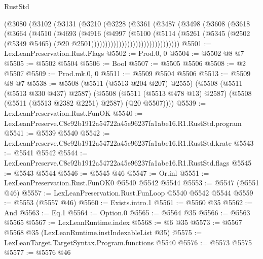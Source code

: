 \begin{lexlean}{RustStd}
\begin{coremodule}
                          (@3080
                            (@3102
                              (@3131
                                (@3210
                                  (@3228
                                    (@3361
                                      (@3487
                                        (@3498
                                          (@3608
                                            (@3618
                                              (@3664
                                                (@4510
                                                  (@4693
                                                    (@4916
                                                      (@4997
                                                        (@5100
                                                          (@5114
                                                            (@5261
                                                              (@5345
                                                                (@2502
                                                                  (@5349 @5465)
                                                                  (@20
                                                                    @2501))))))))))))))))))))))))))))))))
@5501 := LexLeanPreservation.Rust.Flags
@5502 := Prod.{0, 0}
@5504 := @5502 @8 @7
@5505 := @5502 @5504
@5506 := Bool
@5507 := @5505 @5506
@5508 := @2 @5507
@5509 := Prod.mk.{0, 0}
@5511 := @5509 @5504 @5506
@5513 := @5509 @8 @7
@5538 := @5508
    (@5511 (@5513 @204 @207) @2555)
    (@5508
      (@5511 (@5513 @330 @437) @2587)
      (@5508 (@5511 (@5513 @478 @13) @2587) (@5508 (@5511 (@5513 @2382 @2251) @2587) (@20 @5507))))
@5539 := LexLeanPreservation.Rust.FunOK
@5540 := LexLeanPreserve.C8c92b1912a54722a45e96237fa1abe16.R1.RustStd.program
@5541 := @5539 @5540
@5542 := LexLeanPreserve.C8c92b1912a54722a45e96237fa1abe16.R1.RustStd.krate
@5543 := @5541 @5542
@5544 := LexLeanPreserve.C8c92b1912a54722a45e96237fa1abe16.R1.RustStd.flags
@5545 := @5543 @5544
@5546 := @5545 @46
@5547 := Or.inl
@5551 := LexLeanPreservation.Rust.FunOK0 @5540 @5542 @5544
@5553 := @5547 (@5551 @46)
@5557 := LexLeanPreservation.Rust.FunLoop @5540 @5542 @5544
@5559 := @5553 (@5557 @46)
@5560 := Exists.intro.{1}
@5561 := @5560 @35
@5562 := And
@5563 := Eq.{1}
@5564 := Option.{0}
@5565 := @5564 @35
@5566 := @5563 @5565
@5567 := LexLeanRuntime.index
@5568 := @6 @35
@5573 := @5567 @5568 @35 (LexLeanRuntime.instIndexableList @35)
@5575 := LexLeanTarget.TargetSyntax.Program.functions @5540
@5576 := @5573 @5575
@5577 := @5576 @46

\end{coremodule}
\end{lexlean}
